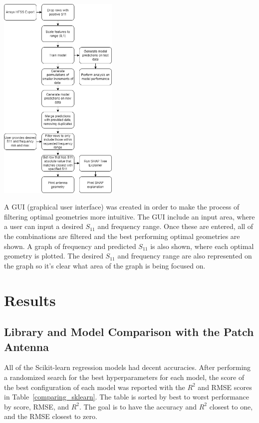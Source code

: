 \documentclass[conference]{IEEEtran}
\newenvironment{Figure}
    {\par\medskip\noindent\minipage{\linewidth}}
    {\endminipage\par\medskip}
\begin{document}
\begin{Figure}
\centering
\includegraphics[width=2.25in]{methodology}
\label{data_flow}
\end{Figure}

A GUI (graphical user interface) was created in order to make the process of filtering optimal geometries more intuitive. The GUI include an input area, where a user can input a desired $S_{11}$ and frequency range. Once these are entered, all of the combinations are filtered and the best performing optimal geometries are shown. A graph of frequency and predicted $S_{11}$ is also shown, where each optimal geometry is plotted. The desired $S_{11}$ and frequency range are also represented on the graph so it's clear what area of the graph is being focused on.


\section{Results}
\subsection{Library and Model Comparison with the Patch Antenna}
All of the Scikit-learn regression models had decent accuracies. After performing a randomized search for the best hyperparameters for each model, the score of the best configuration of each model was reported with the $R^2$ and RMSE scores in Table~\ref{comparing_sklearn}. The table is sorted by best to worst performance by score, RMSE, and $R^2$. The goal is to have the accuracy and $R^2$ closest to one, and the RMSE closest to zero. 
\end{document}
